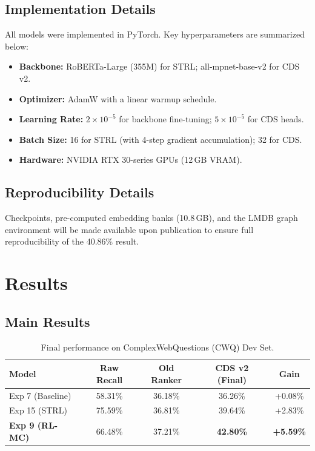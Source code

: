 \documentclass[11pt,a4paper]{article}
\begin{document}
\subsection{Implementation Details}
All models were implemented in PyTorch. Key hyperparameters are summarized
below:
\begin{itemize}
    \item \textbf{Backbone:} RoBERTa-Large (355M) for STRL; all-mpnet-base-v2
          for CDS v2.
    \item \textbf{Optimizer:} AdamW with a linear warmup schedule.
    \item \textbf{Learning Rate:} $2\times10^{-5}$ for backbone fine-tuning;
          $5\times10^{-5}$ for CDS heads.
    \item \textbf{Batch Size:} 16 for STRL (with 4-step gradient accumulation);
          32 for CDS.
    \item \textbf{Hardware:} NVIDIA RTX 30-series GPUs (12\,GB VRAM).
\end{itemize}

\subsection{Reproducibility Details}
Checkpoints, pre-computed embedding banks (10.8\,GB), and the LMDB graph
environment will be made available upon publication to ensure full
reproducibility of the 40.86\% result.


\section{Results}
\label{sec:results}

\subsection{Main Results}
\begin{table}[h]
\centering
\caption{Final performance on ComplexWebQuestions (CWQ) Dev Set.}
\label{tab:main}
\begin{tabular}{lcccc}
\toprule
\textbf{Model} & \textbf{Raw Recall} & \textbf{Old Ranker} & \textbf{CDS v2 (Final)} & \textbf{Gain} \\
\midrule
Exp 7 (Baseline) & 58.31\% & 36.18\% & 36.26\% & +0.08\% \\
Exp 15 (STRL)    & 75.59\% & 36.81\% & 39.64\% & +2.83\% \\
\textbf{Exp 9 (RL-MC)} & 66.48\% & 37.21\% & \textbf{42.80\%} & \textbf{+5.59\%} \\
\bottomrule
\end{tabular}
\end{table}
\end{document}
